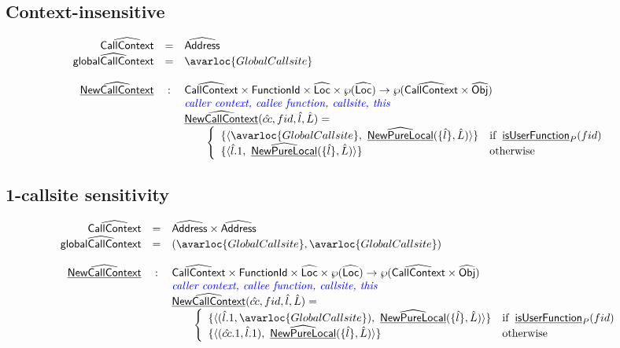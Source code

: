 \subsection{Context-insensitive}
\[
\begin{array}{rcl}
\abs{CallContext} & = & \abs{Address} \\
\abs{globalCallContext} & = & \avarloc{GlobalCallsite} \\
\\

\ahf{NewCallContext} & : & \abs{CallContext} \times \SF{FunctionId} \times \abs{Loc} \times \powerset{\abs{Loc}} \rightarrow \powerset{\abs{CallContext} \times \abs{Obj}} \\
& & \comment{\inblue caller context, callee function, callsite, this}  \\
& & \ahf{NewCallContext}(\hat{cc}, fid, \hat{l}, \hat{L}) = \\
& & \quad\quad \left\{
       \begin{array}{ll}
         \{ \langle \avarloc{GlobalCallsite}, ~ \ahf{NewPureLocal}(\{\hat{l}\}, \hat{L}) \rangle \} & \ifc{\chf{isUserFunction}_P(fid)} \\
         \{ \langle \hat{l}.1, ~ \ahf{NewPureLocal}(\{\hat{l}\}, \hat{L}) \rangle \} & \owc \\
       \end{array}
     \right.\\
\end{array}
\]


\subsection{1-callsite sensitivity}
\[
\begin{array}{rcl}
\abs{CallContext} & = & \abs{Address} \times \abs{Address} \\
\abs{globalCallContext} & = & (\avarloc{GlobalCallsite}, \avarloc{GlobalCallsite}) \\
\\

\ahf{NewCallContext} & : & \abs{CallContext} \times \SF{FunctionId} \times \abs{Loc} \times \powerset{\abs{Loc}} \rightarrow \powerset{\abs{CallContext} \times \abs{Obj}} \\
& & \comment{\inblue caller context, callee function, callsite, this}  \\
& & \ahf{NewCallContext}(\hat{cc}, fid, \hat{l}, \hat{L}) = \\
& & \quad\quad \left\{
       \begin{array}{ll}
         \{ \langle (\hat{l}.1, \avarloc{GlobalCallsite}), ~ \ahf{NewPureLocal}(\{\hat{l}\}, \hat{L}) \rangle \} & \ifc{\chf{isUserFunction}_P(fid)} \\
         \{ \langle (\hat{cc}.1, \hat{l}.1), ~ \ahf{NewPureLocal}(\{\hat{l}\}, \hat{L}) \rangle \} & \owc \\
       \end{array}
     \right.\\
\end{array}
\]


